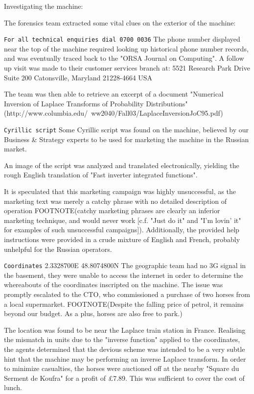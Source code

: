 Investigating the machine:

The forensics team extracted some vital clues on the exterior of the machine:

\texttt{For all technical enquiries dial 0700 0036}
The phone number displayed near the top of the machine required looking up historical phone number records, and was eventually traced back to the "ORSA Journal on Computing". 
A follow up visit was made to their customer services branch at:
5521 Research Park Drive
Suite 200
Catonsville, Maryland 21228-4664
USA

The team was then able to retrieve an excerpt of a document "Numerical Inversion of Laplace Transforms of Probability Distributions" (http://www.columbia.edu/~ww2040/Fall03/LaplaceInversionJoC95.pdf)



\texttt{Cyrillic script}
Some Cyrillic script was found on the machine, believed by our Business & Strategy experts to be used for marketing the machine in the Russian market.

An image of the script was analyzed and translated electronically, yielding the rough English translation of "Fast inverter integrated functions".

It is speculated that this marketing campaign was highly unsuccessful, as the marketing text was merely a catchy phrase with no detailed description of operation FOOTNOTE(catchy marketing phrases are clearly an inferior marketing technique, and would never work [c.f. "Just do it" and "I'm lovin' it" for examples of such unsuccessful campaigns]). Additionally, the provided help instructions were provided in a crude mixture of English and French, probably unhelpful for the Russian operators.




\texttt{Coordinates}
2.3328700E 48.8074800N
The geographic team had no 3G signal in the basement, they were unable to access the internet in order to determine the whereabouts of the coordinates inscripted on the machine. The issue was promptly escalated to the CTO, who commissioned a purchase of two horses from a local supermarket. FOOTNOTE(Despite the falling price of petrol, it remains beyond our budget. As a plus, horses are also free to park.)

The location was found to be near the Laplace train station in France. Realising the mismatch in units due to the "inverse function" applied to the coordinates, the agents determined that the devious scheme was intended to be a very subtle hint that the machine may be performing an inverse Laplace transform. In order to minimize casualties, the horses were auctioned off at the nearby "Square du Serment de Koufra" for a profit of £7.89. This was sufficient to cover the cost of lunch.



